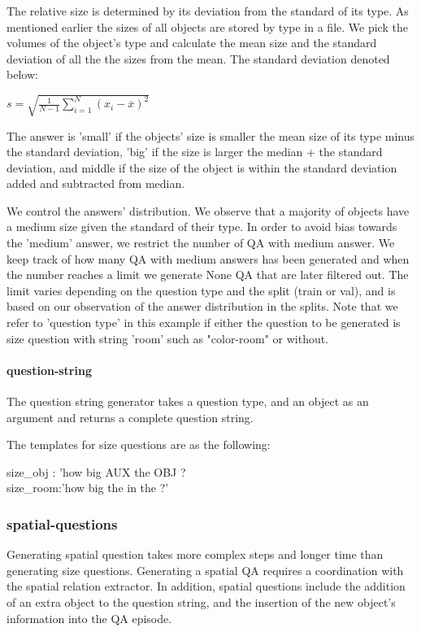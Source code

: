 The relative size is determined by its deviation from the standard of its type. As mentioned earlier the sizes of all objects are stored by type in a file. We pick the volumes of the object's type and calculate the mean size and the standard deviation of all the the sizes from the mean. The standard deviation denoted below: 

\begin{math} s = \sqrt{\frac{1}{N-1} \sum_{i=1}^N (x_i - \overline{x})^2} 
\end{math}

The answer is 'small' if the objects' size is smaller the mean size of its type minus the standard deviation,  'big' if the size is larger the median + the standard deviation, and middle if the size of the object is within the standard deviation added and subtracted from median. 

We control the answers' distribution. We observe that a majority of objects have a medium size given the standard of their type. In order to avoid bias towards the 'medium' answer, we restrict the number of QA with medium answer. We keep track of how many QA with medium answers has been generated and when the number reaches a limit we generate None QA that are later filtered out. The limit varies depending on the question type and the split (train or val), and is based on our observation of the answer distribution in the splits. Note that we refer to 'question type' in this example if either the question to be generated is size question with string 'room' such as "color-room" or without. 


\paragraph{question-string}

The question string generator takes a question type, and an object as an argument and returns a complete question string. 

The templates for size questions are as the following: 

size\_obj : 'how big {AUX} the {OBJ} ? \\
size\_room:'how big   the  in the ?'

\subsubsection{spatial-questions}

Generating spatial question takes more complex steps and longer time than generating size questions. Generating a spatial QA requires a coordination with the spatial relation extractor. In addition, spatial questions include the addition of an extra object to the question string, and the insertion of the new object's information into the QA episode. 

